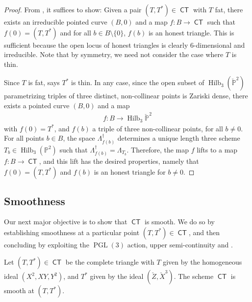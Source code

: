 \documentclass{article}
\renewcommand{\P}{\mathbb{P}}
\DeclareMathOperator{\PGL}{PGL}
\DeclareMathOperator{\Hilb}{Hilb}
\DeclareMathOperator{\CT}{\mathsf{CT}}
\newcommand{\from}{\colon}
\begin{document}
\begin{proof}
  From , it suffices to show: Given
  a pair $(T, T^{*}) \in \CT$ with $T$ fat, there exists an
  irreducible pointed curve $(B,0)$ and a map $f \from B \to \CT$ such
  that $f(0) = (T, T^{*})$ and for all $b \in B \setminus \{0\}$, $f(b)$
  is an honest triangle.  This is sufficient because the open locus of
  honest triangles is clearly $6$-dimensional and irreducible. Note
  that by symmetry, we need not consider the case where $T$ is thin.

  Since $T$ is fat,  says $T^{*}$ is
  thin. In any case, since the open subset of $\Hilb_{3}(\check{\P}^{2})$
  parametrizing triples of three distinct, non-collinear points is
  Zariski dense, there exists a pointed curve $(B,0)$ and a map
  \begin{eqnarray*}
    f \from B \to \Hilb_{3}\check{\P}^{2}
  \end{eqnarray*}
  with $f(0) = T^{*}$, and $f(b)$ a triple of three non-collinear
  points, for all $b \neq 0$. For all points $b \in B$, the space
  $\Lambda_{f(b)}^{\dagger}$ determines a unique length three scheme
  $T_{b} \in \Hilb_{3}(\P^{2})$ such that
  $\Lambda_{f(b)}^{\dagger} = \Lambda_{T_{b}}$. Therefore, the map $f$
  lifts to a map $f \from B \to \CT$, and this lift has the desired
  properties, namely that $f(0) = (T, T^{*})$ and $f(b)$ is an honest triangle
  for $b \neq 0$.
\end{proof}


\subsection{Smoothness} Our next major objective is to show that $\CT$
is smooth. We do so by establishing smoothness at a particular point
$(T, T^{*}) \in \CT$, and then concluding by exploiting the $\PGL(3)$ action,  upper semi-continuity and
.

\begin{proposition}\label{prop:smoothpoint} Let
  $(T, T^{*}) \in \CT$ be the complete triangle with $T$ given by the
  homogeneous ideal $(X^{2},XY,Y^{2})$, and $T^{*}$ given by the ideal
  $(\check{Z}, \check{X}^{3})$. The scheme $\CT$ is smooth at $(T, T^{*})$.
\end{proposition}
\end{document}

